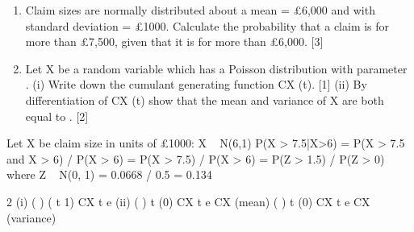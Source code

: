 \documentclass[a4paper,12pt]{article}
\begin{document}
\begin{enumerate}
\item Claim sizes are normally distributed about a mean = £6,000 and with standard
deviation = £1000.
Calculate the probability that a claim is for more than £7,500, given that it is for more
than £6,000. [3]
\item Let X be a random variable which has a Poisson distribution with parameter .
(i) Write down the cumulant generating function CX (t). [1]
(ii) By differentiation of CX (t) show that the mean and variance of X are both
equal to . [2]

\end{enumerate}
 Let X be claim size in units of £1000: X ~ N(6,1)
P(X > 7.5|X>6) = P(X > 7.5 and X > 6) / P(X > 6) = P(X > 7.5) / P(X > 6)
= P(Z > 1.5) / P(Z > 0) where Z ~ N(0, 1)
= 0.0668 / 0.5 = 0.134


2 (i) ( ) ( t 1)
CX t e
(ii) ( ) t (0)
CX t e CX (mean)
( ) t (0)
CX t e CX (variance)
\end{document}
